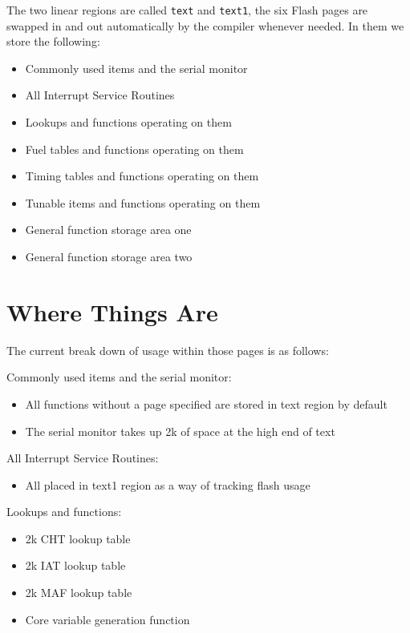 \documentclass[12pt,a4paper,titlepage]{article}
\begin{document}
The two linear regions are called \texttt{text} and \texttt{text1}, the six Flash pages are
swapped in and out automatically by the compiler whenever needed. In them we
store the following:

\begin{itemize}
\item Commonly used items and the serial monitor

\item All Interrupt Service Routines

\item Lookups and functions operating on them

\item Fuel tables and functions operating on them

\item Timing tables and functions operating on them

\item Tunable items and functions operating on them

\item General function storage area one

\item General function storage area two
\end{itemize}



\section{Where Things Are}

The current break down of usage within those pages is as follows:

Commonly used items and the serial monitor:
\begin{itemize}
\item All functions without a page specified are stored in text region by default
\item The serial monitor takes up 2k of space at the high end of text
\end{itemize}

All Interrupt Service Routines:
\begin{itemize}
\item All placed in text1 region as a way of tracking flash usage
\end{itemize}

Lookups and functions:
\begin{itemize}
\item 2k CHT lookup table
\item 2k IAT lookup table
\item 2k MAF lookup table
\item Core variable generation function
\end{itemize}
\end{document}
